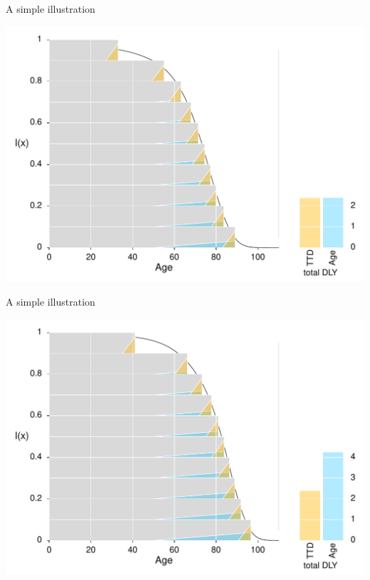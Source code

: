 \documentclass[20pt]{beamer}
\begin{document}
\begin{frame}{A simple illustration}
\begin{center}
 \includegraphics[width=\linewidth]{Figures/Japan1970.pdf}
\end{center}
\end{frame}

\begin{frame}{A simple illustration}
\begin{center}
 \includegraphics[width=\linewidth]{Figures/Japan2010.pdf}
\end{center}
\end{frame}
\end{document}
